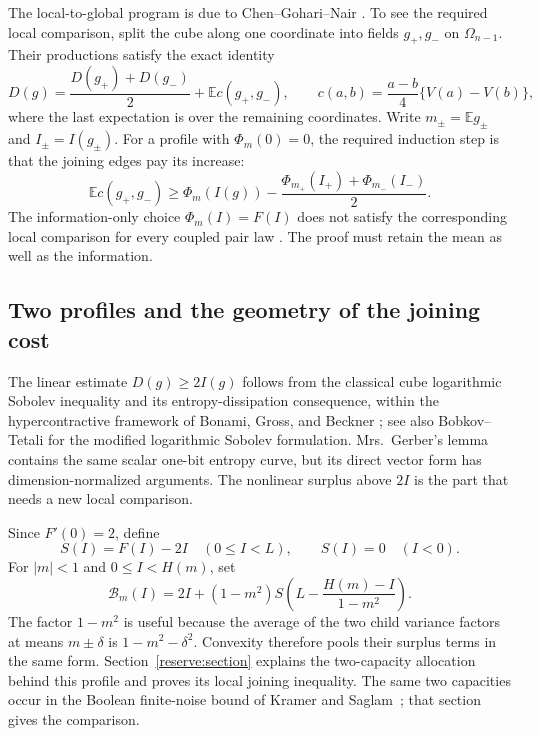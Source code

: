 \documentclass[11pt]{article}
\theoremstyle{definition}
\theoremstyle{remark}
\newcommand{\E}{\mathbb E}
\numberwithin{equation}{section}
\begin{document}
The local-to-global program is due to
Chen--Gohari--Nair \cite[Definition~1 and Theorem~2]{ChenGohariNair2025}.
To see the required local comparison, split the cube along one
coordinate into fields $g_+,g_-$ on $\Omega_{n-1}$. Their productions
satisfy the exact identity
\begin{equation}
 D(g)=\frac{D(g_+)+D(g_-)}2+\E c(g_+,g_-),\qquad
 c(a,b)=\frac{a-b}{4}\{V(a)-V(b)\},
 \label{main:energy-split}
\end{equation}
where the last expectation is over the remaining coordinates.
Write $m_\pm=\E g_\pm$ and $I_\pm=I(g_\pm)$.
For a profile with $\Phi_m(0)=0$, the required induction step is that
the joining edges pay its increase:
\[
 \E c(g_+,g_-)
 \ge\Phi_m(I(g))-
 \frac{\Phi_{m_+}(I_+)+\Phi_{m_-}(I_-)}2.
\]
The information-only choice $\Phi_m(I)=F(I)$ does not satisfy the
corresponding local comparison for every coupled pair law
\cite[Remark~5]{ChenGohariNair2025}. The proof must retain the mean
as well as the information.

\subsection{Two profiles and the geometry of the joining cost}

The linear estimate $D(g)\ge2I(g)$ follows from the classical cube
logarithmic Sobolev inequality and its entropy-dissipation consequence,
within the hypercontractive framework of Bonami, Gross, and Beckner
\cite{Bonami1970,Gross1975,Beckner1975}; see also
Bobkov--Tetali \cite[Example~3.7]{BobkovTetali2006} for the modified logarithmic
Sobolev formulation. Mrs.\ Gerber's lemma \cite{WynerZiv1973} contains
the same scalar one-bit entropy curve, but its direct vector form has
dimension-normalized arguments. The nonlinear surplus above $2I$ is
the part that needs a new local comparison.

Since $F'(0)=2$, define
\[
 S(I)=F(I)-2I\quad(0\le I<L),\qquad S(I)=0\quad(I<0).
\]
For $|m|<1$ and $0\le I<H(m)$, set
\begin{equation}
 \mathcal B_m(I)=2I+(1-m^2)S\!\left(
 L-\frac{H(m)-I}{1-m^2}\right).
 \label{main:profile}
\end{equation}
The factor $1-m^2$ is useful because the average of the two child
variance factors at means $m\pm\delta$ is $1-m^2-\delta^2$.
Convexity therefore pools their surplus terms in the same form.
Section~\ref{reserve:section} explains the two-capacity allocation
behind this profile and proves its local joining inequality.
The same two capacities occur in the Boolean finite-noise bound of
Kramer and Saglam~\cite{KramerSaglam2026}; that section gives the comparison.
\end{document}
